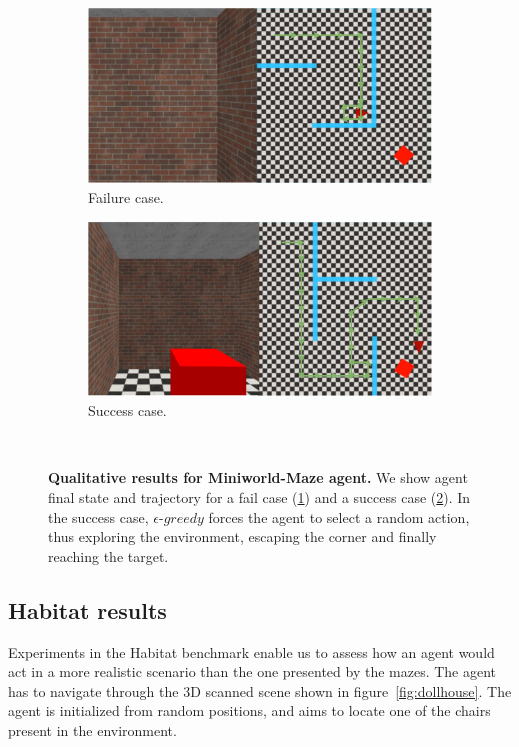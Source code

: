 \begin{figure}
    \centering
    \begin{subfigure}[b]{0.49\textwidth}
        \centering
        \includegraphics[width=\textwidth]{figures/understanding_vsn/qualitative_results/fail}
        \caption{Failure case.}
        \label{fig:maze_qualitative_fail}
    \end{subfigure}
    \hfill
    \begin{subfigure}[b]{0.49\textwidth}
        \centering
        \includegraphics[width=\textwidth]{figures/understanding_vsn/qualitative_results/success}
        \caption{Success case.}
        \label{fig:maze_qualitative_success}
    \end{subfigure}~\caption{\textbf{Qualitative results for Miniworld-Maze agent.} We show agent final state and trajectory for a fail case (\ref{fig:maze_qualitative_fail}) and a success case (\ref{fig:maze_qualitative_success}). In the success case, $\epsilon\text{-}greedy$ forces the agent to select a random action, thus exploring the environment, escaping the corner and finally reaching the target.}
    \label{fig:maze_qualitative}
\end{figure}

\subsection{Habitat results}\label{subsec:habitat-results}
Experiments in the Habitat benchmark enable us to assess how an agent would act in a more realistic scenario than the one presented by the mazes.
The agent has to navigate through the 3D scanned scene shown in figure~\ref{fig:dollhouse}.
The agent is initialized from random positions, and aims to locate one of the chairs present in the environment.

